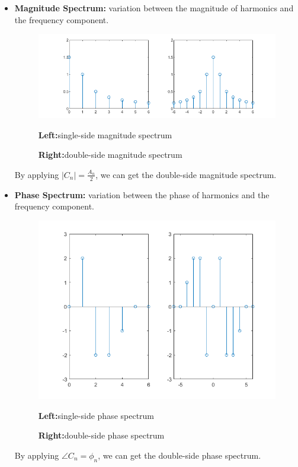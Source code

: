 \documentclass[margin,line]{res}
\begin{document}
\begin{resume}
\begin{itemize}
	\item \textbf{Magnitude Spectrum:} variation between the magnitude of harmonics and the frequency component.\par 
	\begin{figure}[H]
		\centerline{\includegraphics[width=0.9\linewidth]{figure/fig_10.png}}
		\centerline{\textbf{Left:}single-side magnitude spectrum}
		\centerline{\textbf{Right:}double-side magnitude spectrum}
	\end{figure}
	By applying $\left|C_n\right|=\frac{A_n}{2}$, we can get the double-side magnitude spectrum.\par
	\item \textbf{Phase Spectrum:} variation between the phase of harmonics and the frequency component.\par 
	\begin{figure}[H]
		\centerline{\includegraphics[width=0.9\linewidth]{figure/fig_11.png}}
		\centerline{\textbf{Left:}single-side phase spectrum}
		\centerline{\textbf{Right:}double-side phase spectrum}
	\end{figure}
	By applying $\angle C_n=\phi_n$, we can get the double-side phase spectrum.
\end{itemize}

\end{resume}
\end{document}
